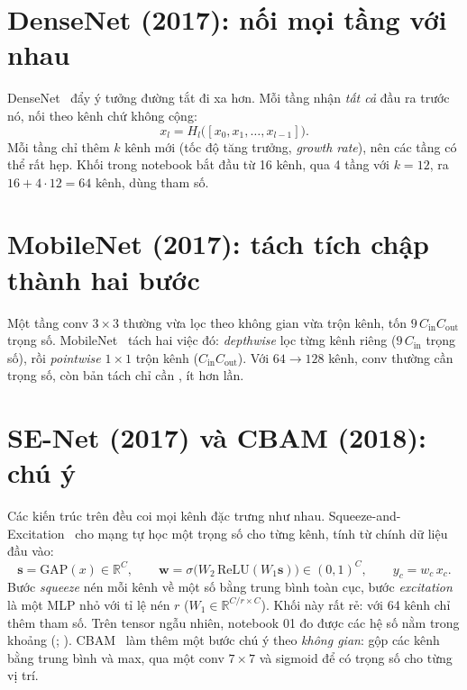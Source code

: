 
\section{DenseNet (2017): nối mọi tầng với nhau}

DenseNet~\cite{huang2017} đẩy ý tưởng đường tắt đi xa hơn. Mỗi tầng nhận \emph{tất cả} đầu ra trước nó, nối
theo kênh chứ không cộng:
\[
  x_l = H_l\bigl([x_0, x_1, \dots, x_{l-1}]\bigr).
\]
Mỗi tầng chỉ thêm $k$ kênh mới (tốc độ tăng trưởng, \emph{growth rate}), nên các tầng có thể rất hẹp. Khối trong
notebook bắt đầu từ 16 kênh, qua 4 tầng với $k=12$, ra $16+4\cdot12=64$ kênh, dùng
 tham số.


\section{MobileNet (2017): tách tích chập thành hai bước}

Một tầng conv $3\times3$ thường vừa lọc theo không gian vừa trộn kênh, tốn $9\,C_{\mathrm{in}}C_{\mathrm{out}}$
trọng số. MobileNet~\cite{howard2017} tách hai việc đó: \emph{depthwise} lọc từng kênh riêng
($9\,C_{\mathrm{in}}$ trọng số), rồi \emph{pointwise} $1\times1$ trộn kênh ($C_{\mathrm{in}}C_{\mathrm{out}}$).
Với $64\to128$ kênh, conv thường cần  trọng số, còn bản tách chỉ cần
, ít hơn  lần.


\section{SE-Net (2017) và CBAM (2018): chú ý}

Các kiến trúc trên đều coi mọi kênh đặc trưng như nhau. Squeeze-and-Excitation~\cite{hu2018} cho mạng tự
học một trọng số cho từng kênh, tính từ chính dữ liệu đầu vào:
\[
  \mathbf{s} = \mathrm{GAP}(x)\in\mathbb{R}^{C},\qquad
  \mathbf{w} = \sigma\bigl(W_2\,\mathrm{ReLU}(W_1\mathbf{s})\bigr)\in(0,1)^{C},\qquad
  y_c = w_c\, x_c .
\]
Bước \emph{squeeze} nén mỗi kênh về một số bằng trung bình toàn cục, bước \emph{excitation} là một MLP nhỏ với
tỉ lệ nén $r$ ($W_1\in\mathbb{R}^{C/r\times C}$). Khối này rất rẻ: với 64 kênh chỉ thêm
 tham số. Trên tensor ngẫu nhiên, notebook 01 đo được các hệ số nằm trong
khoảng (; ). CBAM~\cite{woo2018} làm thêm một bước chú ý theo
\emph{không gian}: gộp các kênh bằng trung bình và max, qua một conv $7\times7$ và sigmoid để có trọng số cho từng vị trí.

